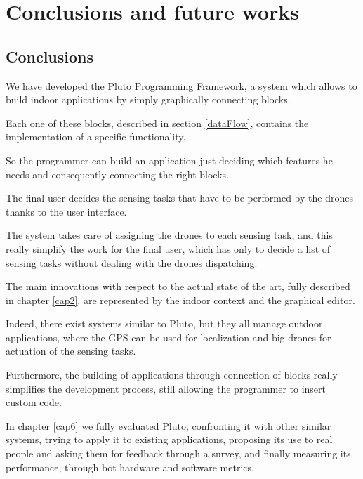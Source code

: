 \chapter{Conclusions and future works}
\label{cap7}


\section{Conclusions}

We have developed the Pluto Programming Framework, a system which allows to build indoor applications by simply graphically connecting blocks.

Each one of these blocks, described in section \ref{dataFlow}, contains the implementation of a specific functionality.

So the programmer can build an application just deciding which features he needs and consequently connecting the right blocks.

The final user decides the sensing tasks that have to be performed by the drones thanks to the user interface.

The system takes care of assigning the drones to each sensing task, and this really simplify the work for the final user, which has only to decide a list of sensing tasks without dealing with the drones dispatching. 

The main innovations with respect to the actual state of the art, fully described in chapter \ref{cap2}, are represented by the indoor context and the graphical editor.

Indeed, there exist systems similar to Pluto, but they all manage outdoor applications, where the GPS can be used for localization and big drones for actuation of the sensing tasks.

Furthermore, the building of applications through connection of blocks really simplifies the development process, still allowing the programmer to insert custom code.

In chapter \ref{cap6} we fully evaluated Pluto, confronting it with other similar systems, trying to apply it to existing applications, proposing its use to real people and asking them for feedback through a survey, and finally measuring its performance, through bot hardware and software metrics.

